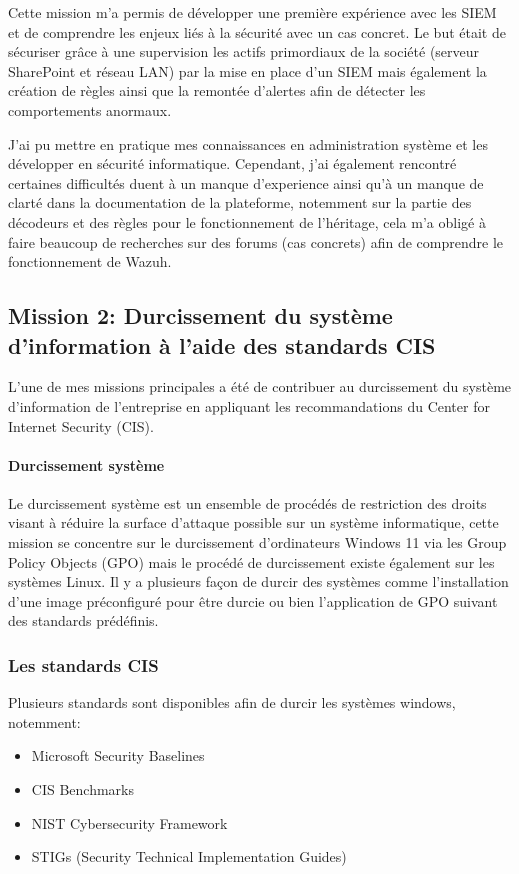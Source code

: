 \documentclass[a4paper, 11pt]{article}
\begin{document}
Cette mission m'a permis de développer une première expérience avec les SIEM et de comprendre les enjeux liés à la sécurité avec un cas concret.
Le but était de sécuriser grâce à une supervision les actifs primordiaux de la société (serveur SharePoint et réseau LAN) par la mise en place d'un SIEM mais également la création de règles 
ainsi que la remontée d'alertes afin de détecter les comportements anormaux.
\par\bigskip
J'ai pu mettre en pratique mes connaissances en administration système et les développer en sécurité informatique.
 Cependant, j'ai également rencontré certaines difficultés duent à un manque d'experience ainsi qu'à un manque de clarté dans la documentation de la plateforme,
notemment sur la partie des décodeurs et des règles pour le fonctionnement de l'héritage, cela m'a obligé à faire beaucoup de recherches sur des forums (cas concrets) afin de comprendre
 le fonctionnement de Wazuh.




\newpage
\subsection{Mission 2: Durcissement du système d'information à l'aide des standards CIS}
 
L'une de mes missions principales a été de contribuer au durcissement du système d'information
 de l'entreprise en appliquant les recommandations du Center for Internet Security (CIS).

 \paragraph{Durcissement système}

 Le durcissement système est un ensemble de procédés de restriction des droits visant à réduire la surface d'attaque possible sur un système
 informatique, cette mission se concentre sur le durcissement d'ordinateurs Windows 11 via les Group Policy Objects (GPO)
 mais le procédé de durcissement existe également sur les systèmes Linux. Il y a plusieurs façon de durcir des systèmes comme
 l'installation d'une image préconfiguré pour être durcie ou bien l'application de GPO suivant des standards prédéfinis.

\subsubsection{Les standards CIS}

  Plusieurs standards sont disponibles afin de durcir les systèmes windows, notemment:
  \begin{itemize}
    \item[$\bullet$] Microsoft Security Baselines
    \item[$\bullet$] CIS Benchmarks
    \item[$\bullet$] NIST Cybersecurity Framework
    \item[$\bullet$] STIGs (Security Technical Implementation Guides)
  \end{itemize}
\par\bigskip
\end{document}

